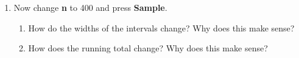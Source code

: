 \documentclass{amsart}
\begin{document}
\begin{Form}
\begin{enumerate}
\begin{enumerate}
\begin{enumerate}
\end{enumerate}
\item Now change {\bf n} to 400 and press {\bf Sample}.
\begin{enumerate}
\item How do the widths of the intervals change? Why does this make sense?\\
 \TextField[name=q6c,width=0.8\textwidth]{}
\item How does the running total change? Why does this make sense?\\
 \TextField[name=q6d,width=0.8\textwidth]{}
\end{enumerate}
\end{enumerate}
\bigskip
\end{enumerate}

\end{Form}
\end{document}
